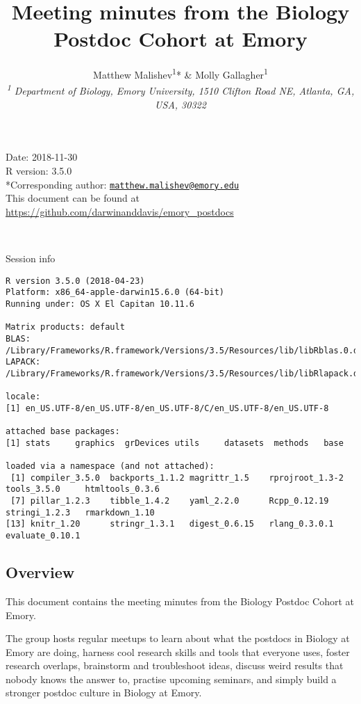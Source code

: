 \documentclass[10,portrait]{article}
\title{Meeting minutes from the Biology Postdoc Cohort at Emory}
\author{Matthew Malishev\textsuperscript{1}* \& Molly
Gallagher\textsuperscript{1}\\[2\baselineskip]\emph{\textsuperscript{1}
Department of Biology, Emory University, 1510 Clifton Road NE, Atlanta,
GA, USA, 30322}}
\date{}
\begin{document}
\maketitle

{
\hypersetup{linkcolor=black}
\setcounter{tocdepth}{2}
\tableofcontents
}
\newpage   

Date: 2018-11-30\\
R version: 3.5.0\\
*Corresponding author:
\href{mailto:matthew.malishev@emory.edu}{\nolinkurl{matthew.malishev@emory.edu}}\\
This document can be found at
\url{https://github.com/darwinanddavis/emory_postdocs}

~

Session info

\begin{verbatim}
R version 3.5.0 (2018-04-23)
Platform: x86_64-apple-darwin15.6.0 (64-bit)
Running under: OS X El Capitan 10.11.6

Matrix products: default
BLAS: /Library/Frameworks/R.framework/Versions/3.5/Resources/lib/libRblas.0.dylib
LAPACK: /Library/Frameworks/R.framework/Versions/3.5/Resources/lib/libRlapack.dylib

locale:
[1] en_US.UTF-8/en_US.UTF-8/en_US.UTF-8/C/en_US.UTF-8/en_US.UTF-8

attached base packages:
[1] stats     graphics  grDevices utils     datasets  methods   base     

loaded via a namespace (and not attached):
 [1] compiler_3.5.0  backports_1.1.2 magrittr_1.5    rprojroot_1.3-2 tools_3.5.0     htmltools_0.3.6
 [7] pillar_1.2.3    tibble_1.4.2    yaml_2.2.0      Rcpp_0.12.19    stringi_1.2.3   rmarkdown_1.10 
[13] knitr_1.20      stringr_1.3.1   digest_0.6.15   rlang_0.3.0.1   evaluate_0.10.1
\end{verbatim}

\newpage  

\subsection{Overview}\label{overview}

This document contains the meeting minutes from the Biology Postdoc
Cohort at Emory.

The group hosts regular meetups to learn about what the postdocs in
Biology at Emory are doing, harness cool research skills and tools that
everyone uses, foster research overlaps, brainstorm and troubleshoot
ideas, discuss weird results that nobody knows the answer to, practise
upcoming seminars, and simply build a stronger postdoc culture in
Biology at Emory.
\end{document}
